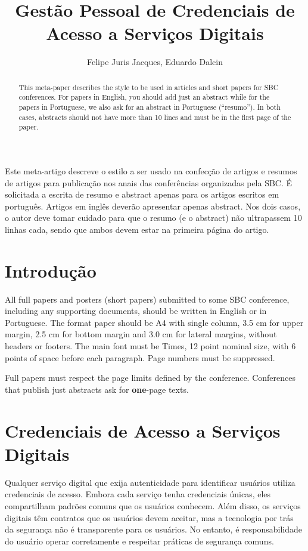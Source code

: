 \documentclass[12pt]{article}
\title{Gestão Pessoal de Credenciais de Acesso a Serviços Digitais}
\author{Felipe Juris Jacques\inst{1}, Eduardo Dalcin\inst{1} }
\begin{document}
 

\maketitle

\begin{abstract}
  This meta-paper describes the style to be used in articles and short papers
  for SBC conferences. For papers in English, you should add just an abstract
  while for the papers in Portuguese, we also ask for an abstract in
  Portuguese (``resumo''). In both cases, abstracts should not have more than
  10 lines and must be in the first page of the paper.
\end{abstract}
     
\begin{resumo} 
  Este meta-artigo descreve o estilo a ser usado na confecção de artigos e
  resumos de artigos para publicação nos anais das conferências organizadas
  pela SBC. É solicitada a escrita de resumo e abstract apenas para os artigos
  escritos em português. Artigos em inglês deverão apresentar apenas abstract.
  Nos dois casos, o autor deve tomar cuidado para que o resumo (e o abstract)
  não ultrapassem 10 linhas cada, sendo que ambos devem estar na primeira
  página do artigo.
\end{resumo}


\section{Introdução}

All full papers and posters (short papers) submitted to some SBC conference,
including any supporting documents, should be written in English or in
Portuguese. The format paper should be A4 with single column, 3.5 cm for upper
margin, 2.5 cm for bottom margin and 3.0 cm for lateral margins, without
headers or footers. The main font must be Times, 12 point nominal size, with 6
points of space before each paragraph. Page numbers must be suppressed.

Full papers must respect the page limits defined by the conference.
Conferences that publish just abstracts ask for \textbf{one}-page texts.

\section{Credenciais de Acesso a Serviços Digitais} \label{sec:firstpage}

Qualquer serviço digital que exija autenticidade para identificar usuários
utiliza credenciais de acesso.
Embora cada serviço tenha credenciais únicas, eles compartilham padrões
comuns que os usuários conhecem.
Além disso, os serviços digitais têm contratos que os usuários devem aceitar, mas a
tecnologia por trás da segurança não é transparente para os usuários.
No entanto, é responsabilidade do usuário operar corretamente e respeitar
práticas de segurança comuns.
\end{document}
